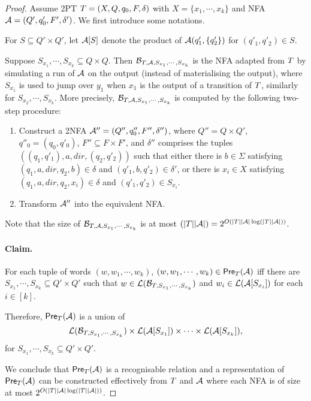 \begin{proof}
Assume 2PT $T=(X, Q, q_0, F, \delta)$ with $X = \{x_1,\cdots, x_k\}$ and NFA $\mathcal{A}=(Q', q'_0, F', \delta')$. We first introduce some notations.

For $S \subseteq Q' \times Q'$, let $\mathcal{A}[S]$ denote the product of $\mathcal{A}(q'_1, \{q'_2\})$ for $(q'_1,q'_2) \in S$. 

Suppose $S_{x_1}, \cdots, S_{x_k} \subseteq Q \times Q$. Then $\mathcal{B}_{T, \mathcal{A}, S_{x_1}, \cdots, S_{x_k}}$ is the NFA adapted from $T$  by simulating a run of $\mathcal{A}$ on the output (instead of materialising the output), where $S_{x_1}$ is used to jump over $y_1$ when $x_1$ is the output of a transition of $T$, similarly for $S_{x_2}, \cdots, S_{x_k}$. More precisely, $\mathcal{B}_{T, \mathcal{A}, S_{x_1}, \cdots, S_{x_k}}$ is computed by the following two-step procedure:
\begin{enumerate} 
\item Construct a 2NFA $\mathcal{A}'' = (Q'', q''_{0}, F'', \delta'')$, where $Q'' = Q \times Q'$, $q''_0 = (q_0, q'_0)$, $F'' \subseteq F \times F'$, and $\delta''$ comprises the tuples $((q_1, q'_1), a, dir, (q_2, q'_2))$ such that either there is $b \in \Sigma$ satisfying $(q_1, a, dir, q_2, b) \in \delta$ and $(q'_1, b, q'_2) \in \delta'$, or there is $x_i \in X$ satisfying $(q_1, a, dir, q_2, x_i) \in \delta$  and $(q'_1, q'_2) \in S_{x_i}$.
\item Transform $\mathcal{A}''$ into the equivalent NFA.
\end{enumerate} 
Note that the size of $\mathcal{B}_{T, \mathcal{A}, S_{x_1}, \cdots, S_{x_k}}$ is at most $(|T||\mathcal{A}|)=2^{O(|T||\mathcal{A}| \log(|T||\mathcal{A}|))}$.

\paragraph{Claim.} For each tuple of words $(w, w_1,\cdots, w_k)$, $(w, w_1,\cdots, w_k) \in \textsf{Pre}_{T}(\mathcal{A})$ iff there are $S_{x_1}, \cdots, S_{x_k} \subseteq Q' \times Q'$ such that $w \in \mathcal{L}(\mathcal{B}_{T, S_{x_1}, \cdots, S_{x_k}})$ and $w_i \in \mathcal{L}(\mathcal{A}[S_{x_i}])$ for each $i \in [k]$.

\medskip

Therefore, $\textsf{Pre}_{T}(\mathcal{A})$ is a union of
\[\mathcal{L}(\mathcal{B}_{T, S_{x_1}, \cdots, S_{x_k}}) \times \mathcal{L}(\mathcal{A}[S_{x_1}]) \times \cdots  \times \mathcal{L}(\mathcal{A}[S_{x_k}]), \]
for $S_{x_1}, \cdots, S_{x_k} \subseteq Q' \times Q'$. 

We conclude that $\textsf{Pre}_{T}(\mathcal{A})$ is a recognisable relation and a representation of $\textsf{Pre}_{T}(\mathcal{A})$ can be constructed effectively from $T$ and $\mathcal{A}$ where each NFA is of size at most $2^{O(|T||\mathcal{A}|\log (|T||\mathcal{A}|))}$.
\end{proof}

